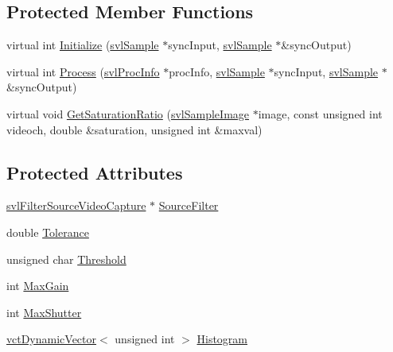 \subsection*{Protected Member Functions}
\begin{DoxyCompactItemize}
\item 
virtual int \hyperlink{classsvl_filter_video_exposure_manager_a10dd305120d6db59cf59769ceb172299}{Initialize} (\hyperlink{classsvl_sample}{svl\+Sample} $\ast$sync\+Input, \hyperlink{classsvl_sample}{svl\+Sample} $\ast$\&sync\+Output)
\item 
virtual int \hyperlink{classsvl_filter_video_exposure_manager_a7f970fa286042e61110755b706a36217}{Process} (\hyperlink{structsvl_proc_info}{svl\+Proc\+Info} $\ast$proc\+Info, \hyperlink{classsvl_sample}{svl\+Sample} $\ast$sync\+Input, \hyperlink{classsvl_sample}{svl\+Sample} $\ast$\&sync\+Output)
\item 
virtual void \hyperlink{classsvl_filter_video_exposure_manager_a4b3ab1c8d4ee5916f08f30f5a873fb43}{Get\+Saturation\+Ratio} (\hyperlink{classsvl_sample_image}{svl\+Sample\+Image} $\ast$image, const unsigned int videoch, double \&saturation, unsigned int \&maxval)
\end{DoxyCompactItemize}
\subsection*{Protected Attributes}
\begin{DoxyCompactItemize}
\item 
\hyperlink{classsvl_filter_source_video_capture}{svl\+Filter\+Source\+Video\+Capture} $\ast$ \hyperlink{classsvl_filter_video_exposure_manager_a1465c2428b76152bd3397825a1d4163b}{Source\+Filter}
\item 
double \hyperlink{classsvl_filter_video_exposure_manager_ade971b6b43879957865e69fb76a045e3}{Tolerance}
\item 
unsigned char \hyperlink{classsvl_filter_video_exposure_manager_ab2fc8e4a7d94af1976849d160ac946ba}{Threshold}
\item 
int \hyperlink{classsvl_filter_video_exposure_manager_ad1b3117790f8bffebf55f8362eefda54}{Max\+Gain}
\item 
int \hyperlink{classsvl_filter_video_exposure_manager_a0c93ed7790f14669fdf52207f0a1105e}{Max\+Shutter}
\item 
\hyperlink{classvct_dynamic_vector}{vct\+Dynamic\+Vector}$<$ unsigned int $>$ \hyperlink{classsvl_filter_video_exposure_manager_a124bab248348d2ee81a6e1629366a146}{Histogram}
\end{DoxyCompactItemize}
